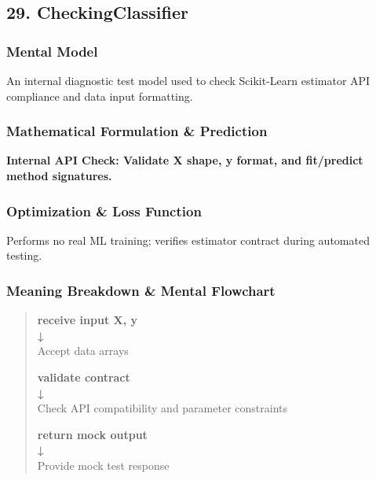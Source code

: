 \documentclass[
  10pt,
  letterpaper,
]{article}
\begin{document}
\hypertarget{checkingclassifier}{%
\subsection{29. CheckingClassifier}\label{checkingclassifier}}

\hypertarget{mental-model-28}{%
\subsubsection{Mental Model}\label{mental-model-28}}

An internal diagnostic test model used to check Scikit-Learn estimator API compliance and data input formatting.

\hypertarget{mathematical-formulation-prediction-28}{%
\subsubsection{Mathematical Formulation \& Prediction}\label{mathematical-formulation-prediction-28}}

\textbf{Internal API Check: Validate X shape, y format, and fit/predict method signatures.}

\hypertarget{optimization-loss-function-28}{%
\subsubsection{Optimization \& Loss Function}\label{optimization-loss-function-28}}

Performs no real ML training; verifies estimator contract during automated testing.

\hypertarget{meaning-breakdown-mental-flowchart-28}{%
\subsubsection{Meaning Breakdown \& Mental Flowchart}\label{meaning-breakdown-mental-flowchart-28}}

\begin{quote}
\textbf{receive input X, y\\
↓\\
}Accept data arrays

\textbf{validate contract\\
↓\\
}Check API compatibility and parameter constraints

\textbf{return mock output\\
↓\\
}Provide mock test response
\end{quote}
\end{document}
